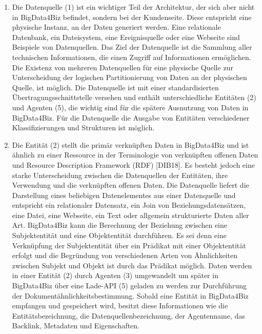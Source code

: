 \begin{enumerate}
	\item Die Datenquelle (1) ist ein wichtiger Teil der Architektur, der sich aber nicht in BigData4Biz befindet, sondern bei der Kundenseite. Diese entspricht eine physische Instanz, an der Daten generiert werden. Eine relationale Datenbank, ein Dateisystem, eine Ereignisquelle oder eine Webseite sind Beispiele von Datenquellen. Das Ziel der Datenquelle ist die Sammlung aller technischen Informationen, die einen Zugriff auf Informationen ermöglichen. Die Existenz von mehreren Datenquellen für eine physische Quelle zur Unterscheidung der logischen Partitionierung von Daten an der physischen Quelle, ist möglich. Die Datenquelle ist mit einer standardisierten Übertragungsschnittstelle versehen und enthält unterschiedliche Entitäten (2) und Agenten (5), die wichtig sind für die spätere Ausnutzung von Daten in BigData4Biz. Für die Datenquelle die Ausgabe von Entitäten verschiedener Klassifizierungen und Strukturen ist möglich.
	\item Die Entität (2) stellt die primär verknüpften Daten in BigData4Biz und ist ähnlich zu einer Ressource in der Terminologie von verknüpften offenen Daten und Resource Description Framework (RDF) [DIB18]. Es besteht jedoch eine starke Unterscheidung zwischen die Datenquellen der Entitäten, ihre Verwendung und die verknüpften offenen Daten. Die Datenquelle liefert die Darstellung eines beliebigen Datenelementes aus einer Datenquelle und entspricht ein relationaler Datensatz, ein Join von Beziehungsdatensätzen, eine Datei, eine Webseite, ein Text oder allgemein strukturierte Daten aller Art. BigData4Biz kann die Berechnung der Beziehung zwischen eine Subjektentität und eine Objektentität durchführen. Es sei denn eine Verknüpfung der Subjektentität über ein Prädikat mit einer Objektentität erfolgt und die Begründung von verschiedenen Arten von Ähnlichkeiten zwischen Subjekt und Objekt ist durch das Prädikat möglich. Daten werden in einer Entität (2) durch Agenten (3) umgewandelt um später in BigData4Biz über eine Lade-API (5) geladen zu werden zur Durchführung der Dokumentähnlichkeitsbestimmung. Sobald eine Entität in BigData4Biz empfangen und gespeichert wird, besitzt diese Informationen wie die Entitätsbezeichnung, die Datenquellenbezeichnung, der Agentenname, das Backlink, Metadaten und Eigenschaften.

\end{enumerate}
